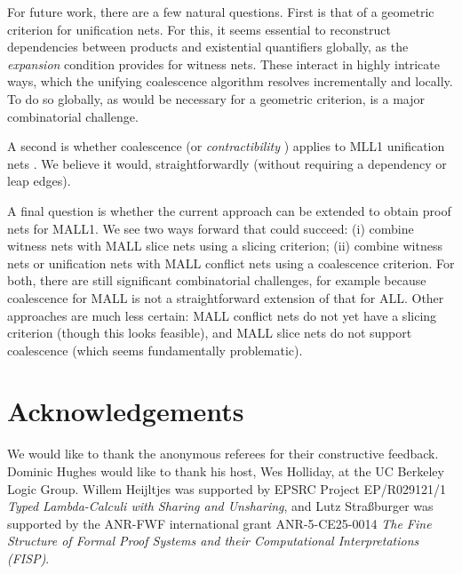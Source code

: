 \documentclass[UKenglish]{lipics-v2019}
\newcommand\+{+}
\renewcommand\*{\times}
\begin{document}
For future work, there are a few natural questions. First is that of a geometric criterion for unification nets. For this, it seems essential to reconstruct dependencies between products and existential quantifiers globally, as the \emph{expansion} condition provides for witness nets. These interact in highly intricate ways, which the unifying coalescence algorithm resolves incrementally and locally. To do so globally, as would be necessary for a geometric criterion, is a major combinatorial challenge.

A second is whether coalescence (or \emph{contractibility} \cite{Danos-1990}) applies to MLL1 unification nets \cite{Hughes-2018}. We believe it would, straightforwardly (without requiring a dependency or leap edges).

A final question is whether the current approach can be extended to obtain proof nets for MALL1. We see two ways forward that could succeed: (i) combine witness nets with MALL slice nets \cite{Hughes-vanGlabbeek-2005} using a slicing criterion; (ii) combine witness nets or unification nets with MALL conflict nets \cite{Hughes-Heijltjes-2016} using a coalescence criterion. For both, there are still significant combinatorial challenges, for example because coalescence for MALL is not a straightforward extension of that for ALL. Other approaches are much less certain: MALL conflict nets do not yet have a slicing criterion (though this looks feasible), and MALL slice nets do not support coalescence (which seems fundamentally problematic).


\section*{Acknowledgements}

We would like to thank the anonymous referees for their constructive feedback. Dominic Hughes would like to thank his host, Wes Holliday, at the UC Berkeley Logic Group. Willem Heijltjes was supported by EPSRC Project EP/R029121/1 \emph{Typed Lambda-Calculi with Sharing and Unsharing}, and Lutz Stra{\ss}burger was supported by the ANR-FWF international
grant ANR-5-CE25-0014 \emph{The Fine Structure of Formal Proof
Systems and their Computational Interpretations (FISP)}.




\newpage
\appendix
\end{document}
